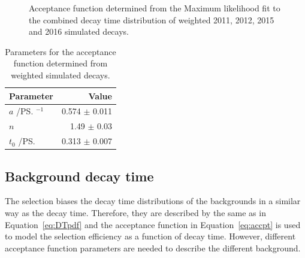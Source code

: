 {\begin{figure}[tbp]
    \caption{Acceptance function determined from the Maximum likelihood fit to the combined decay time distribution of weighted 2011, 2012, 2015 and 2016 simulated decays.} %
    \label{fig:accptplot}
\end{figure}


\begin{table}[tbp]
\begin{center}
\begin{tabular}{lr}
\toprule \toprule
Parameter & Value \\
\midrule
$a$ /\ps$^{-1}$ & 0.574 $\pm$ 0.011\\
$n$ & 1.49 $\pm$ 0.03 \\
$t_{0}$ /\ps &  0.313 $\pm$ 0.007 \\

\bottomrule \bottomrule
\end{tabular}
\vspace{0.7cm}             
\caption{Parameters for the \bsmumu acceptance function determined from weighted simulated \bsmumu decays.}
\label{tab:accptsig}
\end{center}
\vspace{-1.0cm}                                                                                                                                               
\end{table}

\subsection{Background decay time \pdfs}
\label{sec:bkgDTpdf}



The selection biases the decay time distributions of the backgrounds in a similar way as the \bsmumu decay time. Therefore, they are described by the same \pdf as in Equation~\ref{eq:DTpdf} and the acceptance function in Equation~\ref{eq:accpt} is used to model the selection efficiency as a function of decay time. However, different acceptance function parameters are needed to describe the different background. 

}
